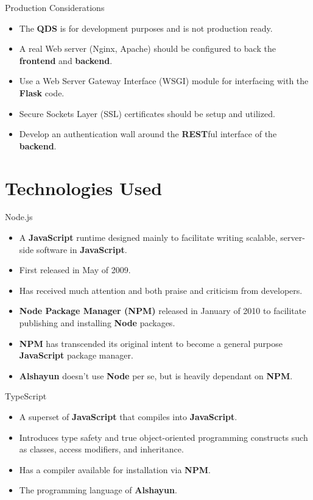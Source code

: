 \documentclass{beamer}
\begin{document}
\begin{frame}{Production Considerations}
    \begin{itemize}
        \item The \textbf{QDS} is for development purposes and is not production
            ready.
        \item A real Web server (Nginx, Apache) should be configured to back the
            \textbf{frontend} and \textbf{backend}.
        \item Use a Web Server Gateway Interface (WSGI) module for interfacing
            with the \textbf{Flask} code.
        \item Secure Sockets Layer (SSL) certificates should be setup and
            utilized.
        \item Develop an authentication wall around the \textbf{REST}ful
            interface of the \textbf{backend}.
    \end{itemize}
\end{frame}

\section{Technologies Used}

\begin{frame}{Node.js}
    \begin{itemize}
        \item A \textbf{JavaScript} runtime designed mainly to facilitate
            writing scalable, server-side software in \textbf{JavaScript}.
        \item First released in May of 2009.
        \item Has received much attention and both praise and criticism from
            developers.
        \item \textbf{Node Package Manager (NPM)} released in January of 2010 to
            facilitate publishing and installing \textbf{Node} packages.
        \item \textbf{NPM} has transcended its original intent to become a
            general purpose \textbf{JavaScript} package manager.
        \item \textbf{Alshayun} doesn't use \textbf{Node} per se, but is heavily
            dependant on \textbf{NPM}.
    \end{itemize}
\end{frame}

\begin{frame}{TypeScript}
    \begin{itemize}
        \item A superset of \textbf{JavaScript} that compiles into
            \textbf{JavaScript}.
        \item Introduces type safety and true object-oriented programming
            constructs such as classes, access modifiers, and inheritance.
        \item Has a compiler available for installation via \textbf{NPM}.
        \item The programming language of \textbf{Alshayun}.
    \end{itemize}
\end{frame}
\end{document}
